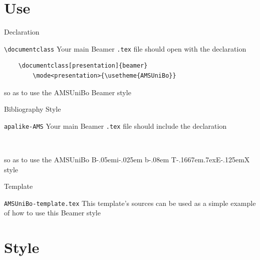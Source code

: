 \documentclass[presentation,bologna,apice]{beamer}\mode<presentation>{\usetheme{AMSUniBo}}
\def\BibTeX{{\rm B\kern-.05em{\sc i\kern-.025em b}\kern-.08em
    T\kern-.1667em\lower.7ex\hbox{E}\kern-.125emX}}
\begin{document}
\section{Use}

\begin{frame}[c,fragile]{Declaration}
%
\begin{block}{\texttt{\textbackslash{}documentclass}}
Your main Beamer \texttt{.tex} file should open with the declaration
%
\begin{verbatim}
    \documentclass[presentation]{beamer}
        \mode<presentation>{\usetheme{AMSUniBo}}
\end{verbatim}
%
so as to use the AMSUniBo Beamer style
\end{block}
%
\end{frame}

\begin{frame}[c,fragile]{Bibliography Style}
%
\begin{block}{\texttt{apalike-AMS}}
Your main Beamer \texttt{.tex} file should include the declaration
\begin{verbatim}
    
\end{verbatim}
so as to use the AMSUniBo \BibTeX{} style
\end{block}
%
\end{frame}

\begin{frame}[c,fragile]{Template}
%
\begin{block}{\texttt{AMSUniBo-template.tex}}
This template's sources can be used as a simple example of how to use this Beamer style
\end{block}
%
\end{frame}


\section{Style}
\end{document}
